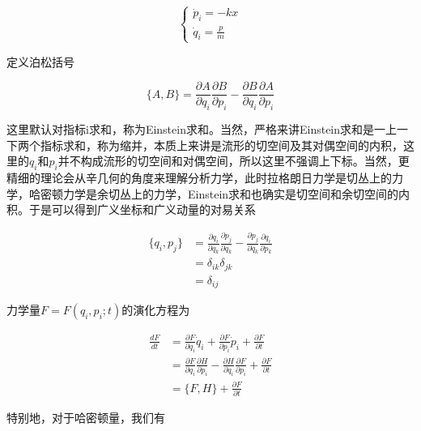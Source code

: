 \begin{equation}
    \left\{
        \begin{array}{lr}
            \dot{p}_i = -kx \\
            \dot{q}_i = \frac{p}{m}
        \end{array}
    \right.
\end{equation}

定义泊松括号

\begin{equation}
    \{A,B\}=\frac{\partial A}{\partial q_i}\frac{\partial B}{\partial p_i}-\frac{\partial B}{\partial q_i}\frac{\partial A}{\partial p_i}
\end{equation}

这里默认对指标i求和，称为Einstein求和。当然，严格来讲Einstein求和是一上一下两个指标求和，称为缩并，本质上来讲是流形的切空间及其对偶空间的内积，这里的$q_i$和$p_i$并不构成流形的切空间和对偶空间，所以这里不强调上下标。当然，更精细的理论会从辛几何的角度来理解分析力学，此时拉格朗日力学是切丛上的力学，哈密顿力学是余切丛上的力学，Einstein求和也确实是切空间和余切空间的内积。于是可以得到广义坐标和广义动量的对易关系

\begin{equation}
    \begin{split}
        \{q_i, p_j\} &= \frac{\partial q_i}{\partial q_k}\frac{\partial p_j}{\partial q_k}-\frac{\partial p_j}{\partial q_k}\frac{\partial q_i}{\partial p_k} \\
            &= \delta_{ik}\delta_{jk} \\
            &= \delta_{ij}
    \end{split}
\end{equation}

力学量$F=F(q_i,p_i;t)$的演化方程为

\begin{equation}
    \begin{split}
        \frac{dF}{dt} &= \frac{\partial F}{\partial q_i}\dot{q}_i+\frac{\partial F}{\partial p_i}\dot{p}_i+\frac{\partial F}{\partial t} \\
            &= \frac{\partial F}{\partial q_i}\frac{\partial H}{\partial p_i}-\frac{\partial H}{\partial q_i}\frac{\partial F}{\partial p_i}+\frac{\partial F}{\partial t} \\
            &= \{F,H\}+\frac{\partial F}{\partial t}
    \end{split}
\end{equation}

特别地，对于哈密顿量，我们有

